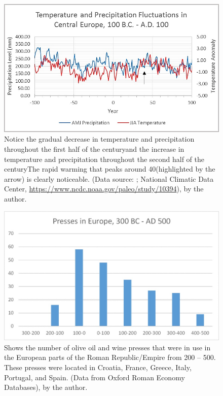 	
	\begin{figure}[!p]
		\includegraphics[width=\linewidth]{figures/Davis_Agroeconomy_Fig8.jpg}
		\centering
		\caption{Notice the gradual decrease in temperature and precipitation throughout the first half of the  century\BC and the increase in temperature and precipitation throughout the second half of the  century\BC The rapid warming that peaks around 40\AD  (highlighted by the arrow) is clearly noticeable. (Data source: \textcite{Büntgen_2011b}; National Climatic Data Center, \url{https://www.ncdc.noaa.gov/paleo/study/10394}), by the author.}
		\label{fig:DavisFig8}
	\end{figure}
	
	
	
	\begin{figure}[!p]
		\includegraphics[width=\linewidth]{figures/Davis_Agroeconomy_Fig9.jpg}
		\centering
		\caption{Shows the number of olive oil and wine presses that were in use in the European parts of the Roman Republic/Empire from 200 \BC –  500\AD. These presses were located in Croatia, France, Greece, Italy, Portugal, and Spain. (Data from Oxford Roman Economy Databases), by the author.}
		\label{fig:DavisFig9}
	\end{figure}
	
